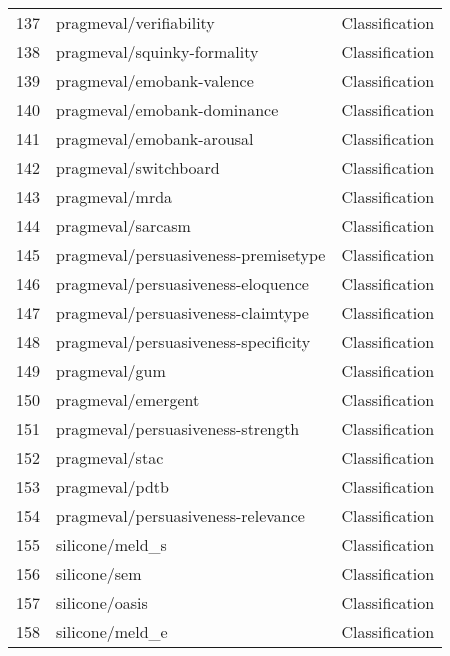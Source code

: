 \documentclass[11pt]{article}
\begin{document}
\begin{longtable}{lll}
137 & pragmeval/verifiability \citep{park2014identifying} & Classification \\
138 & pragmeval/squinky-formality \citep{DBLP:journals/corr/Lahiri15} & Classification \\
139 & pragmeval/emobank-valence \citep{buechel-hahn-2017-emobank} & Classification \\
140 & pragmeval/emobank-dominance \citep{buechel-hahn-2017-emobank} & Classification \\
141 & pragmeval/emobank-arousal \citep{buechel-hahn-2017-emobank} & Classification \\
142 & pragmeval/switchboard \citep{Godfrey:1992:STS:1895550.1895693} & Classification \\
143 & pragmeval/mrda \citep{shriberg2004icsi} & Classification \\
144 & pragmeval/sarcasm \citep{OrabySarc} & Classification \\
145 & pragmeval/persuasiveness-premisetype \citep{Persuasion2018Ng} & Classification \\
146 & pragmeval/persuasiveness-eloquence \citep{Persuasion2018Ng} & Classification \\
147 & pragmeval/persuasiveness-claimtype \citep{Persuasion2018Ng} & Classification \\
148 & pragmeval/persuasiveness-specificity \citep{Persuasion2018Ng} & Classification \\
149 & pragmeval/gum \citep{Zeldes2017} & Classification \\
150 & pragmeval/emergent \citep{Ferreira2016EmergentAN} & Classification \\
151 & pragmeval/persuasiveness-strength \citep{Persuasion2018Ng} & Classification \\
152 & pragmeval/stac \citep{asher-etal-2016-discourse} & Classification \\
153 & pragmeval/pdtb \citep{prasad-etal-2008-penn} & Classification \\
154 & pragmeval/persuasiveness-relevance \citep{Persuasion2018Ng} & Classification \\
155 & silicone/meld\_s \citep{chen2018emotionlines} & Classification \\
156 & silicone/sem \citep{mckeown2011semaine} & Classification \\
157 & silicone/oasis \citep{leech2003generic} & Classification \\
158 & silicone/meld\_e \citep{chen2018emotionlines} & Classification \\

\end{longtable}
\end{document}
